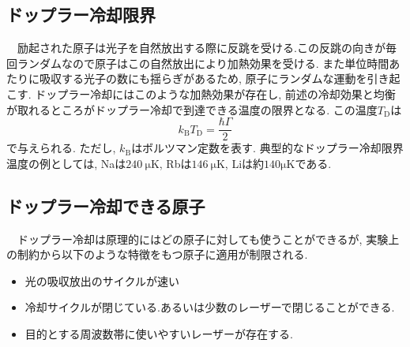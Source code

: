 \documentclass[uplatex, dvipdfmx, a4paper, report, papersize, 11pt]{jsbook}
\begin{document}
\subsection{ドップラー冷却限界}
　励起された原子は光子を自然放出する際に反跳を受ける.この反跳の向きが毎回ランダムなので原子はこの自然放出により加熱効果を受ける. また単位時間あたりに吸収する光子の数にも揺らぎがあるため, 原子にランダムな運動を引き起こす.
ドップラー冷却にはこのような加熱効果が存在し, 前述の冷却効果と均衡が取れるところがドップラー冷却で到達できる温度の限界となる. この温度$T _ { \mathrm { D } }$は
\begin{equation}
  k _ { \mathrm { B } } T _ { \mathrm { D } } = \frac { \hbar \Gamma } { 2 }
\end{equation}
で与えられる. ただし, $k _ { \mathrm { B } }$はボルツマン定数を表す. 典型的なドップラー冷却限界温度の例としては, Naは$240\ \mathrm{\mu K}$, Rbは$146\ \mathrm{\mu K}$, Liは約$140 \mathrm{\mu K}$である\cite{PhysRevX.6.041004, 気体原子のレーザー冷却, ubcthesis}.
\subsection{ドップラー冷却できる原子}
　ドップラー冷却は原理的にはどの原子に対しても使うことができるが, 実験上の制約から以下のような特徴をもつ原子に適用が制限される\cite{ノーベル賞と分光学}.
\begin{itemize}
  \item 光の吸収放出のサイクルが速い
  \item 冷却サイクルが閉じている.あるいは少数のレーザーで閉じることができる.
  \item 目的とする周波数帯に使いやすいレーザーが存在する.
\end{itemize}

\newpage
\end{document}
